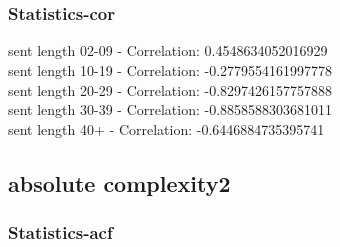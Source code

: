 \documentclass{article}%
\begin{document}
\begin{figure}[ht]%
\centering%
\setlength{\abovecaptionskip}{-35pt}%
%
%
\\%
%
%
\\%
%
\end{figure}

%
\newpage%
\subsubsection{Statistics{-}cor}%
\label{ssubsec:Statistics{-}cor}%
\noindent%
sent length 02-09 - Correlation: 0.4548634052016929\\%
sent length 10-19 - Correlation: -0.2779554161997778\\%
sent length 20-29 - Correlation: -0.8297426157757888\\%
sent length 30-39 - Correlation: -0.8858588303681011\\%
sent length 40+ - Correlation: -0.6446884735395741\\

%
\newpage

%
\subsection{absolute complexity2}%
\label{subsec:absolutecomplexity2}%
\subsubsection{Statistics{-}acf}%
\label{ssubsec:Statistics{-}acf}%
\end{document}

